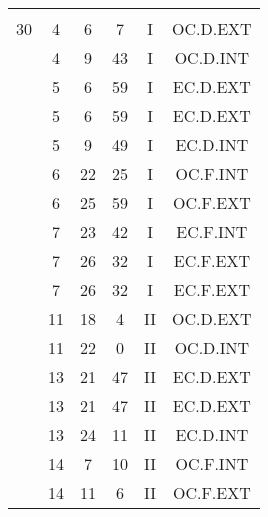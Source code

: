 \documentclass[12pt, a4paper]{article}
\begin{document}
\begin{multicols}{3}
{\begin{tabular}{c c c c c c}
	 	 	 	 & & & & & \\%
	 	 	 	30 & 4 & 6 & 7 & I & OC.D.EXT\\%
	 	 	 	 & 4 & 9 & 43 & I & OC.D.INT\\%
	 	 	 	 & 5 & 6 & 59 & I & EC.D.EXT\\%
	 	 	 	 & 5 & 6 & 59 & I & EC.D.EXT\\%
	 	 	 	 & 5 & 9 & 49 & I & EC.D.INT\\%
	 	 	 	 & 6 & 22 & 25 & I & OC.F.INT\\%
	 	 	 	 & 6 & 25 & 59 & I & OC.F.EXT\\%
	 	 	 	 & 7 & 23 & 42 & I & EC.F.INT\\%
	 	 	 	 & 7 & 26 & 32 & I & EC.F.EXT\\%
	 	 	 	 & 7 & 26 & 32 & I & EC.F.EXT\\%
	 	 	 	 & 11 & 18 & 4 & II & OC.D.EXT\\%
	 	 	 	 & 11 & 22 & 0 & II & OC.D.INT\\%
	 	 	 	 & 13 & 21 & 47 & II & EC.D.EXT\\%
	 	 	 	 & 13 & 21 & 47 & II & EC.D.EXT\\%
	 	 	 	 & 13 & 24 & 11 & II & EC.D.INT\\%
	 	 	 	 & 14 & 7 & 10 & II & OC.F.INT\\%
	 	 	 	 & 14 & 11 & 6 & II & OC.F.EXT\\%
	 	 \end{tabular}
 	}
\end{multicols}
\end{document}
